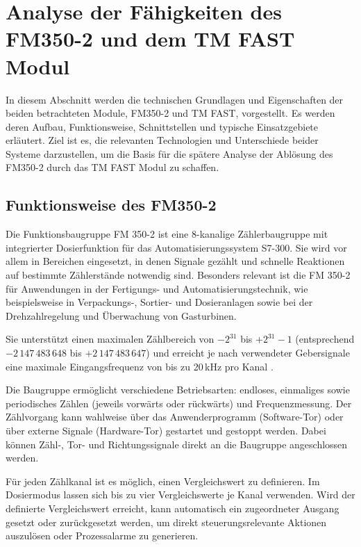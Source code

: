 \chapter{Analyse der Fähigkeiten des FM350-2 und dem TM FAST Modul}
\label{chap:analyse}

In diesem Abschnitt werden die technischen Grundlagen und Eigenschaften der beiden betrachteten Module, FM350-2 und TM FAST, vorgestellt. 
Es werden deren Aufbau, Funktionsweise, Schnittstellen und typische Einsatzgebiete erläutert. Ziel ist es, die relevanten Technologien 
und Unterschiede beider Systeme darzustellen, um die Basis für die spätere Analyse der Ablösung des FM350-2 durch das TM FAST Modul 
zu schaffen.

\section{Funktionsweise des FM350-2}  
\label{chap:fm3502}

Die Funktionsbaugruppe FM 350-2 ist eine 8-kanalige Zählerbaugruppe mit integrierter Dosierfunktion für das Automatisierungssystem S7-300. Sie wird vor allem in Bereichen eingesetzt, in denen Signale gezählt und schnelle Reaktionen auf bestimmte Zählerstände notwendig sind. Besonders relevant ist die FM 350-2 für Anwendungen in der Fertigungs- und Automatisierungstechnik, wie beispielsweise in Verpackungs-, Sortier- und Dosieranlagen sowie bei der Drehzahlregelung und Überwachung von Gasturbinen.

Sie unterstützt einen maximalen Zählbereich von \(-2^{31}\) bis \(+2^{31} - 1\) (entsprechend \(-2\,147\,483\,648\) bis \(+2\,147\,483\,647\)) und erreicht je nach verwendeter Gebersignale eine maximale Eingangsfrequenz von bis zu 20\,kHz pro Kanal \cite{fm350_Handbuch}.

Die Baugruppe ermöglicht verschiedene Betriebsarten: endloses, einmaliges sowie periodisches Zählen (jeweils vorwärts oder rückwärts) und Frequenzmessung. Der Zählvorgang kann wahlweise über das Anwenderprogramm (Software-Tor) oder über externe Signale (Hardware-Tor) gestartet und gestoppt werden. Dabei können Zähl-, Tor- und Richtungssignale direkt an die Baugruppe angeschlossen werden.

Für jeden Zählkanal ist es möglich, einen Vergleichswert zu definieren. Im Dosiermodus lassen sich bis zu vier Vergleichswerte je Kanal verwenden. Wird der definierte Vergleichswert erreicht, kann automatisch ein zugeordneter Ausgang gesetzt oder zurückgesetzt werden, um direkt steuerungsrelevante Aktionen auszulösen oder Prozessalarme zu generieren.

